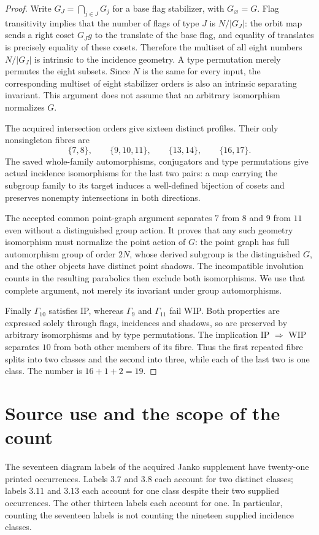 \documentclass[11pt]{article}
\begin{document}
\begin{proof}
Write $G_J=\bigcap_{j\in J}G_j$ for a base flag stabilizer, with
$G_\varnothing=G$. Flag transitivity implies that the number of flags
of type $J$ is $N/|G_J|$: the orbit map sends a right coset $G_Jg$ to the
translate of the base flag, and equality of translates is precisely equality
of these cosets. Therefore the multiset of all eight numbers $N/|G_J|$
is intrinsic to the incidence geometry. A type permutation merely permutes
the eight subsets. Since $N$ is the same for every input, the corresponding
multiset of eight stabilizer orders is also an intrinsic separating invariant.
This argument does not assume that an arbitrary isomorphism normalizes $G$.

The acquired intersection orders give sixteen distinct profiles. Their
only nonsingleton fibres are
\[
 \{7,8\},\qquad \{9,10,11\},\qquad
 \{13,14\},\qquad \{16,17\}.
\]
The saved whole-family automorphisms, conjugators and type permutations
give actual incidence isomorphisms for the last two pairs: a map carrying
the subgroup family to its target induces a well-defined bijection of
cosets and preserves nonempty intersections in both directions.

The accepted common point-graph argument separates $7$ from $8$ and
$9$ from $11$ even without a distinguished group action. It proves that
any such geometry isomorphism must normalize the point action of $G$:
the point graph has full automorphism group of order $2N$, whose derived
subgroup is the distinguished $G$, and the other objects have distinct
point shadows. The incompatible involution counts in the resulting
parabolics then exclude both isomorphisms. We use that complete argument,
not merely its invariant under group automorphisms.

Finally $\Gamma_{10}$ satisfies IP, whereas $\Gamma_9$ and $\Gamma_{11}$
fail WIP. Both properties are expressed solely through flags, incidences
and shadows, so are preserved by arbitrary isomorphisms and by type
permutations. The implication IP $\Rightarrow$ WIP separates $10$ from
both other members of its fibre. Thus the first repeated fibre splits
into two classes and the second into three, while each of the last two
is one class. The number is $16+1+2=19$.
\end{proof}

\section*{Source use and the scope of the count}
The seventeen diagram labels of the acquired Janko supplement have
twenty-one printed occurrences. Labels $3.7$ and $3.8$ each account for
two distinct classes; labels $3.11$ and $3.13$ each account for one class
despite their two supplied occurrences. The other thirteen labels each
account for one. In particular, counting the seventeen labels is not
counting the nineteen supplied incidence classes.
\end{document}
